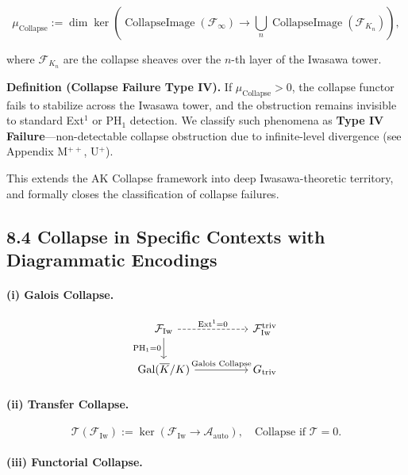 \documentclass[11pt]{article}
\newcommand{\CollapseImage}{\operatorname{CollapseImage}}
\begin{document}
\[
\mu_{\mathrm{Collapse}} := \dim \ker \left( \CollapseImage(\mathcal{F}_\infty) \longrightarrow \bigcup_n \CollapseImage(\mathcal{F}_{K_n}) \right),
\]

where \( \mathcal{F}_{K_n} \) are the collapse sheaves over the \( n \)-th layer of the Iwasawa tower.

\textbf{Definition (Collapse Failure Type IV).}  
If \( \mu_{\mathrm{Collapse}} > 0 \), the collapse functor fails to stabilize across the Iwasawa tower, and the obstruction remains invisible to standard Ext$^1$ or $\mathrm{PH}_1$ detection. We classify such phenomena as \textbf{Type IV Failure}—non-detectable collapse obstruction due to infinite-level divergence (see Appendix M$^{++}$, U$^+$).

This extends the AK Collapse framework into deep Iwasawa-theoretic territory, and formally closes the classification of collapse failures.


\subsection*{8.4 Collapse in Specific Contexts with Diagrammatic Encodings}

\paragraph{(i) Galois Collapse.}

\[
\begin{tikzcd}[column sep=huge]
\mathcal{F}_{\mathrm{Iw}} \arrow[r, dashed, "\mathrm{Ext}^1 = 0"] \arrow[d, "\mathrm{PH}_1 = 0"']
& \mathcal{F}_{\mathrm{Iw}}^{\mathrm{triv}} \\
\mathrm{Gal}(\overline{K}/K) \arrow[r, "\text{Galois Collapse}"]
& G_{\mathrm{triv}}
\end{tikzcd}
\]

\paragraph{(ii) Transfer Collapse.}

\[
\mathcal{T}(\mathcal{F}_{\mathrm{Iw}}) := \ker \left( \mathcal{F}_{\mathrm{Iw}} \to \mathcal{A}_{\mathrm{auto}} \right), \quad
\text{Collapse if } \mathcal{T} = 0.
\]

\paragraph{(iii) Functorial Collapse.}
\end{document}
